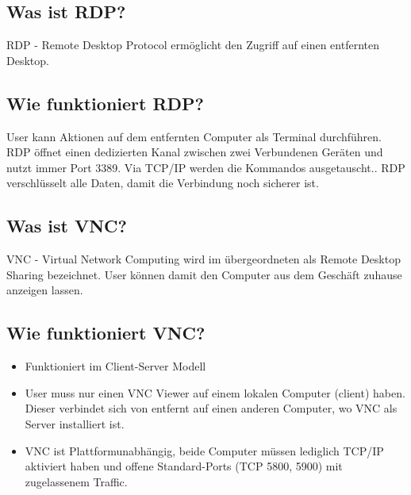 \subsection*{Was ist RDP?}
RDP - Remote Desktop Protocol ermöglicht den Zugriff auf einen entfernten Desktop.

\subsection*{Wie funktioniert RDP?}
User kann Aktionen auf dem entfernten Computer als Terminal durchführen. RDP öffnet einen dedizierten Kanal zwischen zwei Verbundenen Geräten und nutzt immer Port 3389. Via TCP/IP werden die Kommandos ausgetauscht.. RDP verschlüsselt alle Daten, damit die Verbindung noch sicherer ist.

\subsection*{Was ist VNC?}
VNC - Virtual Network Computing wird im übergeordneten als Remote Desktop Sharing bezeichnet. User können damit den Computer aus dem Geschäft zuhause anzeigen lassen.

\subsection*{Wie funktioniert VNC?}
\begin{itemize}
    \item Funktioniert im Client-Server Modell
    \item User muss nur einen VNC Viewer auf einem lokalen Computer (client) haben. Dieser verbindet sich von entfernt auf einen anderen Computer, wo VNC als Server installiert ist.
    \item VNC ist Plattformunabhängig, beide Computer müssen lediglich TCP/IP aktiviert haben und offene Standard-Ports (TCP 5800, 5900) mit zugelassenem Traffic.
\end{itemize}

